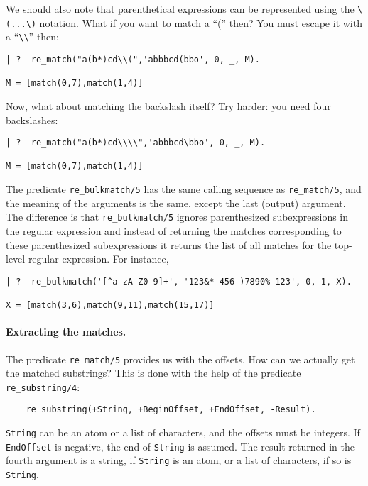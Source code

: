 We should also note that parenthetical expressions can be represented
using the \verb|\(...\)| notation. What if you want to match a ``('' then?
You must escape it with a ``\verb|\\|'' then:
\begin{verbatim}
| ?- re_match("a(b*)cd\\(",'abbbcd(bbo', 0, _, M).

M = [match(0,7),match(1,4)]
\end{verbatim}
Now, what about matching the backslash itself? Try harder: you need four
backslashes: 
\begin{verbatim}
| ?- re_match("a(b*)cd\\\\",'abbbcd\bbo', 0, _, M).

M = [match(0,7),match(1,4)]
\end{verbatim}

The predicate \verb|re_bulkmatch/5| has the same calling sequence as
\verb|re_match/5|, and the meaning of the arguments is the same, except the
last (output) argument. The difference is that \verb|re_bulkmatch/5|
ignores parenthesized subexpressions in the regular expression and instead
of returning the matches corresponding to these parenthesized
subexpressions it returns the list of all matches for the top-level regular
expression. For instance, 
\begin{verbatim}
| ?- re_bulkmatch('[^a-zA-Z0-9]+', '123&*-456 )7890% 123', 0, 1, X).

X = [match(3,6),match(9,11),match(15,17)]  
\end{verbatim}

\paragraph{Extracting the matches.}
The predicate \verb|re_match/5| provides us with the offsets. How can we
actually get the matched substrings? This is done with the help of the
predicate \verb|re_substring/4|:
\begin{verbatim}
    re_substring(+String, +BeginOffset, +EndOffset, -Result).
\end{verbatim}
{\tt String} can be an atom or a list of characters, and the offsets must
be integers.  If {\tt EndOffset} is negative, the end of {\tt String} is
assumed.  The result returned in the fourth
argument is a string, if {\tt String} is an atom, or a list of characters,
if so is {\tt String}.

